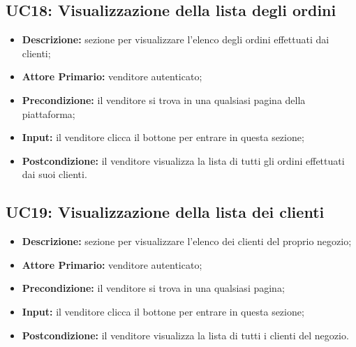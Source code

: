         \subsection{UC18: Visualizzazione della lista degli ordini}
        \label{sec:UC18}
        \begin{itemize}
            \item \textbf{Descrizione:} sezione per visualizzare l'elenco degli ordini effettuati dai clienti;
            \item \textbf{Attore Primario:} venditore autenticato; 
            \item \textbf{Precondizione:} il venditore si trova in una qualsiasi pagina della piattaforma;
            \item \textbf{Input:} il venditore clicca il bottone per entrare in questa sezione; 
            \item \textbf{Postcondizione:} il venditore visualizza la lista di tutti gli ordini effettuati dai suoi clienti.
        \end{itemize}


        \subsection{UC19: Visualizzazione della lista dei clienti}
        \label{sec:UC19}
            \begin{itemize}
                \item \textbf{Descrizione:} sezione per visualizzare l'elenco dei clienti del proprio negozio;
                \item \textbf{Attore Primario:} venditore autenticato; 
                \item \textbf{Precondizione:} il venditore si trova in una qualsiasi pagina;
                \item \textbf{Input:} il venditore clicca il bottone per entrare in questa sezione; 
                \item \textbf{Postcondizione:} il venditore visualizza la lista di tutti i clienti del negozio.
                \end{itemize}



